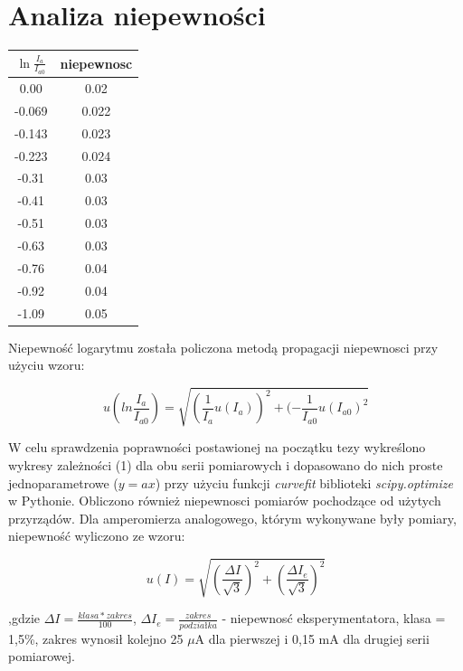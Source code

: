 \documentclass[a4paper,10pt]{article}
\begin{document}
\section{Analiza niepewności}
\begin{center}
\begin{tabular}{|c c|}
  \hline
  $\ln{\frac{I_a}{I_{a0}}}$& niepewnosc \\
  \hline
   0.00  &0.02  \\\hline
  -0.069 &0.022 \\\hline
  -0.143 &0.023 \\\hline
  -0.223 &0.024 \\\hline
  -0.31  &0.03  \\\hline
  -0.41  &0.03  \\\hline
  -0.51  &0.03\\\hline
  -0.63  &0.03\\\hline
  -0.76  &0.04\\\hline
  -0.92  &0.04\\\hline
  -1.09  &0.05\\\hline
\end{tabular}
\end{center}

\vspace{1cm}
Niepewność logarytmu została policzona metodą propagacji niepewnosci przy użyciu wzoru:

\begin{equation}
u(ln{\frac{I_a}{I_{a0}}}) = \sqrt{(\frac{1}{I_a} u(I_a))^2 + (-\frac{1}{I_{a0}} u(I_{a0})^2}
\end{equation}

W celu sprawdzenia poprawności postawionej na początku tezy wykreślono wykresy zależności (1) dla obu serii pomiarowych i dopasowano do nich proste jednoparametrowe ($y=ax$) przy użyciu funkcji \emph{curvefit} biblioteki \emph{scipy.optimize} w Pythonie. Obliczono również niepewnosci pomiarów pochodzące od użytych przyrządów. Dla amperomierza analogowego, którym wykonywane były pomiary,  niepewność wyliczono ze wzoru:

\begin{equation}
u(I) = \sqrt{(\frac{\Delta I}{\sqrt{3}})^2 + (\frac{\Delta I_e}{\sqrt{3}})^2}
\end{equation}

,gdzie $\Delta I = \frac{klasa*zakres}{100}$, $\Delta I_e = \frac{zakres}{podziałka}$ - niepewnosć eksperymentatora, klasa = 1,5\%, zakres wynosił kolejno 25 $\mu$A dla pierwszej i 0,15 mA dla drugiej serii pomiarowej.
\end{document}
